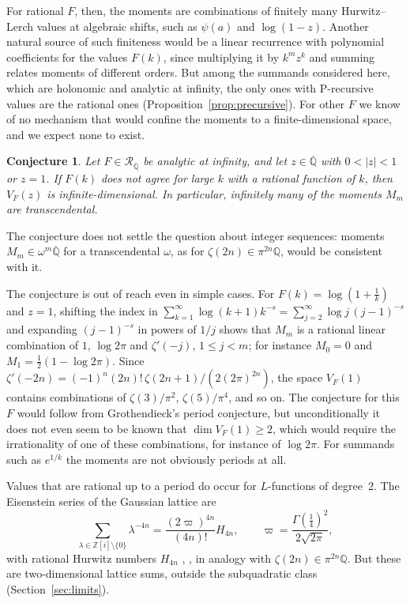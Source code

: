 \documentclass[11pt,reqno]{amsart}
\newtheorem{conjecture}[theorem]{Conjecture}
\theoremstyle{definition}
\theoremstyle{remark}
\newcommand{\QQ}{\mathbb{Q}}
\newcommand{\Qbar}{\overline{\mathbb{Q}}}
\newcommand{\RegQ}{\mathcal{R}_{\Qbar}}
\newcommand{\ZZ}{\mathbb{Z}}
\begin{document}
For rational $F$, then, the moments are combinations of finitely many Hurwitz--Lerch values at algebraic shifts, such as
$\psi(a)$ and $\log(1-z)$. Another natural source of such finiteness would be a linear recurrence with polynomial
coefficients for the values $F(k)$, since multiplying it by $k^mz^k$ and summing relates moments of different orders.
But among the summands considered here, which are holonomic and analytic at infinity, the only ones with
P-recursive values are the rational ones (Proposition~\ref{prop:precursive}). For other $F$ we know of no mechanism that would confine the moments to a
finite-dimensional space, and we expect none to exist.

\begin{conjecture}\label{conj:algebraic}
Let $F \in \RegQ$ be analytic at infinity, and let $z \in \Qbar$ with $0 < |z| < 1$ or $z = 1$. If $F(k)$ does not
agree for large $k$ with a rational function of $k$, then $V_F(z)$ is infinite-dimensional. In particular,
infinitely many of the moments $M_m$ are transcendental.
\end{conjecture}

The conjecture does not settle the question about integer sequences: moments $M_m \in \omega^m\Qbar$ for a
transcendental $\omega$, as for $\zeta(2n) \in \pi^{2n}\QQ$, would be consistent with it.

The conjecture is out of reach even in simple cases. For $F(k) = \log(1+\frac1k)$ and $z = 1$, shifting the index in
$\sum_{k=1}^{\infty}\log(k+1)k^{-s} = \sum_{j=2}^{\infty}\log j\,(j-1)^{-s}$ and expanding $(j-1)^{-s}$ in powers of
$1/j$ shows that $M_m$ is a rational linear combination of $1$, $\log 2\pi$ and $\zeta'(-j)$, $1 \le j < m$; for
instance $M_0 = 0$ and $M_1 = \frac12(1 - \log2\pi)$. Since $\zeta'(-2n) = (-1)^n(2n)!\,\zeta(2n+1)/(2(2\pi)^{2n})$,
the space $V_F(1)$ contains combinations of $\zeta(3)/\pi^2$, $\zeta(5)/\pi^4$, and so on. The conjecture for this $F$
would follow from Grothendieck's period conjecture, but unconditionally it does not even seem to be known that
$\dim V_F(1) \ge 2$, which would require the irrationality of one of these combinations, for instance of
$\log 2\pi$. For summands such as $e^{1/k}$ the
moments are not obviously periods at all.

Values that are rational up to a period do occur for $L$-functions of degree~$2$. The Eisenstein series of the
Gaussian lattice are
\[
  \sum_{\lambda\in\ZZ[i]\setminus\{0\}}\lambda^{-4n} = \frac{(2\varpi)^{4n}}{(4n)!}H_{4n}, \qquad
  \varpi = \frac{\Gamma(\frac14)^2}{2\sqrt{2\pi}},
\]
with rational Hurwitz numbers $H_{4n}$ \cite{Hur99}, \cite[Chapter~12]{AIK14}, in analogy with
$\zeta(2n) \in \pi^{2n}\QQ$. But these are two-dimensional lattice sums, outside the subquadratic class
(Section~\ref{sec:limits}).
\end{document}
